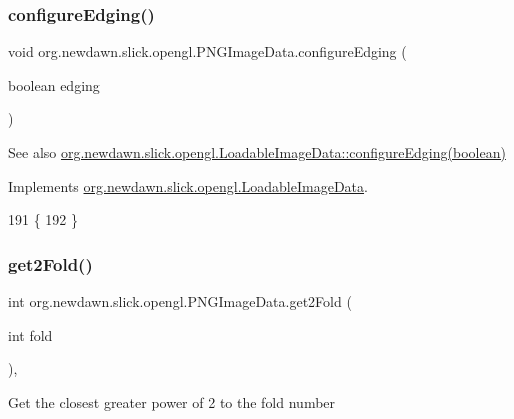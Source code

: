 \subsubsection{\texorpdfstring{configure\+Edging()}{configureEdging()}}
{\footnotesize\ttfamily void org.\+newdawn.\+slick.\+opengl.\+P\+N\+G\+Image\+Data.\+configure\+Edging (\begin{DoxyParamCaption}\item[{boolean}]{edging }\end{DoxyParamCaption})\hspace{0.3cm}{\ttfamily [inline]}}

\begin{DoxySeeAlso}{See also}
\mbox{\hyperlink{interfaceorg_1_1newdawn_1_1slick_1_1opengl_1_1_loadable_image_data_a1f9fb94bae3936761535408ba7afc0df}{org.\+newdawn.\+slick.\+opengl.\+Loadable\+Image\+Data\+::configure\+Edging(boolean)}} 
\end{DoxySeeAlso}


Implements \mbox{\hyperlink{interfaceorg_1_1newdawn_1_1slick_1_1opengl_1_1_loadable_image_data_a1f9fb94bae3936761535408ba7afc0df}{org.\+newdawn.\+slick.\+opengl.\+Loadable\+Image\+Data}}.


\begin{DoxyCode}
191                                                 \{
192     \}
\end{DoxyCode}
\mbox{\label{classorg_1_1newdawn_1_1slick_1_1opengl_1_1_p_n_g_image_data_a9066e5e41011de1eef2d1d40e4d245d7}} 
\subsubsection{\texorpdfstring{get2\+Fold()}{get2Fold()}}
{\footnotesize\ttfamily int org.\+newdawn.\+slick.\+opengl.\+P\+N\+G\+Image\+Data.\+get2\+Fold (\begin{DoxyParamCaption}\item[{int}]{fold }\end{DoxyParamCaption})\hspace{0.3cm}{\ttfamily [inline]}, {\ttfamily [private]}}

Get the closest greater power of 2 to the fold number


